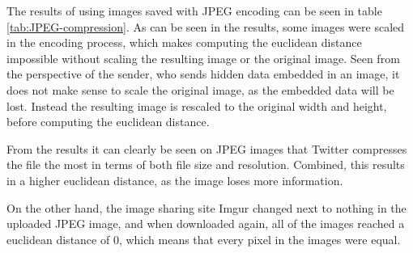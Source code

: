 The results of using images saved with JPEG encoding can be seen in table \ref{tab:JPEG-compression}.
As can be seen in the results, some images were scaled in the encoding process, which makes computing the euclidean distance impossible without scaling the resulting image or the original image.
Seen from the perspective of the sender, who sends hidden data embedded in an image, it does not make sense to scale the original image, as the embedded data will be lost.
Instead the resulting image is rescaled to the original width and height, before computing the euclidean distance.

From the results it can clearly be seen on JPEG images that Twitter compresses the file the most in terms of both file size and resolution.
Combined, this results in a higher euclidean distance, as the image loses more information.

On the other hand, the image sharing site Imgur changed next to nothing in the uploaded JPEG image, and when downloaded again, all of the images reached a euclidean distance of 0, which means that every pixel in the images were equal.

